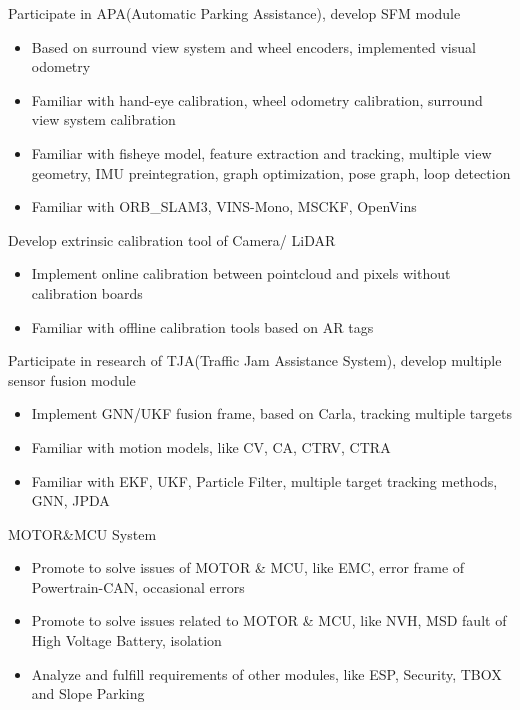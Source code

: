 \documentclass{resume}
\begin{document}

Participate in APA(Automatic Parking Assistance), develop SFM module
\begin{itemize}
  \item Based on surround view system and wheel encoders, implemented visual odometry
  \item Familiar with hand-eye calibration, wheel odometry calibration, surround view system calibration
  \item Familiar with fisheye model, feature extraction and tracking, multiple view geometry, IMU preintegration, graph optimization, pose graph, loop detection
  \item Familiar with ORB\_SLAM3, VINS-Mono, MSCKF, OpenVins
\end{itemize}

Develop extrinsic calibration tool of Camera/ LiDAR
\begin{itemize}
  \item Implement online calibration between pointcloud and pixels without calibration boards
  \item Familiar with offline calibration tools based on AR tags
\end{itemize}

Participate in research of TJA(Traffic Jam Assistance System), develop multiple sensor fusion module
\begin{itemize}
  \item Implement GNN/UKF fusion frame, based on Carla, tracking multiple targets
  \item Familiar with motion models, like CV, CA, CTRV, CTRA
  \item Familiar with EKF, UKF, Particle Filter, multiple target tracking methods, GNN, JPDA
\end{itemize}


MOTOR\&MCU System
\begin{itemize}
  \item Promote to solve issues of MOTOR \& MCU, like EMC, error frame of Powertrain-CAN, occasional errors
  \item Promote to solve issues related to MOTOR \& MCU, like NVH, MSD fault of High Voltage Battery, isolation
  \item Analyze and fulfill requirements of other modules, like ESP, Security, TBOX and Slope Parking
\end{itemize}
\end{document}
